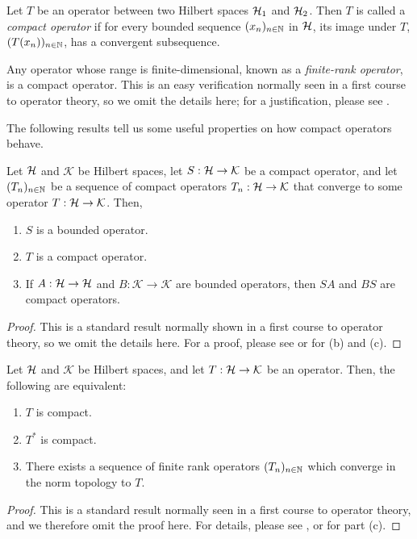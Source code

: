 \begin{definition}
  Let $T$ be an operator between two Hilbert spaces $\mathcal{H}_1$ and $\mathcal{H}_2$. Then $T$ is called a {\emph{compact operator}} if for every bounded sequence $(x_n)_{n \in \mathbb{N}}$ in $\mathcal{H}$, its image under $T$, $(T(x_n))_{n \in \mathbb{N}}$, has a convergent subsequence.
\end{definition}

\begin{example}
  Any operator whose range is finite-dimensional, known as a {\emph{finite-rank operator}}, is a compact operator. This is an easy verification normally seen in a first course to operator theory, so we omit the details here; for a justification, please see {\cite[Examples 11.10 (1)]{muscat}}.
\end{example}

The following results tell us some useful properties on how compact operators behave.

\begin{proposition}\label{lbl_prop_compact_implies_bounded}
  Let $\mathcal{H}$ and $\mathcal{K}$ be Hilbert spaces, let $S: \mathcal{H} \to \mathcal{K}$ be a compact operator, and let $(T_n)_{n \in \mathbb{N}}$ be a sequence of compact operators $T_n: \mathcal{H} \to \mathcal{K}$ that converge to some operator $T: \mathcal{H} \to \mathcal{K}$. Then,
  \begin{enumerate}[label = (\alph*)]
    \item $S$ is a bounded operator.
    \item $T$ is a compact operator.
    \item If $A: \mathcal{H} \to \mathcal{H}$ and $B: \mathcal{K} \to \mathcal{K}$ are bounded operators, then $SA$ and $BS$ are compact operators.
  \end{enumerate}
\end{proposition}
\begin{proof}
  This is a standard result normally shown in a first course to operator theory, so we omit the details here. For a proof, please see {\cite[Chapter 2, Proposition 4.2]{conway}} or for (b) and {\cite[Proposition 11.9]{Muscat}} (c).
\end{proof}


\begin{theorem}
  Let $\mathcal{H}$ and $\mathcal{K}$ be Hilbert spaces, and let $T:\mathcal{H} \to \mathcal{K}$ be an operator. Then, the following are equivalent:
  \begin{enumerate}[label = (\alph*)]
    \item $T$ is compact.
    \item $T^*$ is compact.
    \item There exists a sequence of finite rank operators $(T_n)_{n \in \mathbb{N}}$ which converge in the norm topology to $T$.
  \end{enumerate}
\end{theorem}
\begin{proof}
  This is a standard result normally seen in a first course to operator theory, and we therefore omit the proof here. For details, please see {\cite[Chapter 2, Theorem 4.4]{conway}}, or {\cite[Examples 11.10 (2)]{muscat}} for part (c).
\end{proof}


